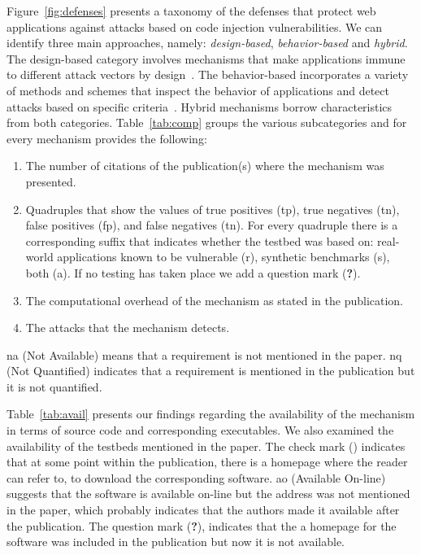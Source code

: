 \documentclass[conference]{IEEEtran}
\newcommand{\tick}{\ding{52}}
\begin{document}
Figure~\ref{fig:defenses} presents a taxonomy of the
defenses that protect web applications against attacks based on
code injection vulnerabilities.
We can identify three main approaches, namely:
{\it design-based}, {\it behavior-based}
and {\it hybrid}.
The design-based category involves mechanisms that make applications
immune to different attack vectors by design~\cite{JL75,L81}.
The behavior-based incorporates a variety of methods and
schemes that inspect the behavior of applications
and detect attacks based on specific criteria~\cite{D76,A00}.
Hybrid mechanisms borrow characteristics from both categories.
Table~\ref{tab:comp} groups the various subcategories
and for every mechanism provides the following:

\begin{enumerate}
\item The number of citations of the publication(s) where
the mechanism was presented.
\item Quadruples that show the values of true
positives ({\sc tp}), true negatives ({\sc tn}),
false positives ({\sc fp}), and false negatives
({\sc tn}). For every quadruple there is a corresponding
suffix that indicates whether the testbed was based
on: real-world applications known to be vulnerable
(r), synthetic benchmarks (s), both (a).
If no testing has taken place we add a question
mark ({\bf ?}).
\item The computational overhead of the
mechanism as stated in the publication.
\item The attacks that the mechanism detects.
\end{enumerate}

\noindent
{\sc na} (Not Available) means that a requirement is not
mentioned in the paper. {\sc nq} (Not Quantified)
indicates that a requirement is mentioned in the publication
but it is not quantified.

Table~\ref{tab:avail} presents
our findings regarding the availability of the mechanism
in terms of source code and corresponding executables.
We also examined the availability of the testbeds mentioned in the paper.
The check mark (\tick) indicates that at some point within the publication,
there is a homepage where the reader can refer to, to download the
corresponding software. {\sc ao} (Available On-line) suggests that
the software is available on-line but the address was not mentioned
in the paper, which probably indicates that the authors made
it available after the publication. The question mark ({\bf ?}),
indicates that the a homepage for the software was included
in the publication but now it is not available.
\end{document}
